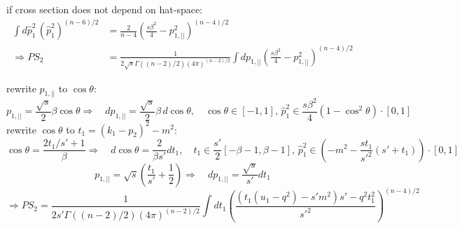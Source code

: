 if cross section does not depend on hat-space:
\begin{align}
\int\!\!d\hat p_1^2\,(\hat p_1^2)^{(n-6)/2} &= \frac 2 {n-4}\left(\frac{s \beta^2}{4}-p_{1,||}^2\right)^{(n-4)/2}\\
\Rightarrow PS_2 &= \frac 1 {2\sqrt s\Gamma((n-2)/2)(4\pi)^{(n-2)/2}}\int\!\!dp_{1,||}\left(\frac{s \beta^2}{4}-p_{1,||}^2\right)^{(n-4)/2}
\end{align}

rewrite $p_{1,||}$ to $\cos\theta$:
\begin{equation}
p_{1,||} = \frac{\sqrt s} 2 \beta\cos\theta \Rightarrow\quad dp_{1,||} = \frac{\sqrt s} 2 \beta\,d\!\cos\theta,\quad \cos\theta\in[-1,1],\, \hat p_1^2 \in \frac{s \beta^2}{4}\left(1-\cos^2\theta\right)\cdot[0,1]
\end{equation}
rewrite $\cos\theta$ to $t_1 = (k_1-p_2)^2-m^2$:
\begin{equation}
\cos\theta = \frac{2t_1/s'+1}{\beta} \Rightarrow\quad d\!\cos\theta = \frac 2 {\beta s'} dt_1,\quad t_1\in \frac {s'} 2[-\beta -1,\beta -1],\, \hat p_1^2 \in (-m^2-\frac{st_1}{s'^2}(s'+t_1))\cdot[0,1]
\end{equation}
\begin{equation}
p_{1,||} = \sqrt s\left(\frac{t_1}{s'}+\frac{1} 2\right) \Rightarrow\quad  dp_{1,||} = \frac{\sqrt s}{s'} dt_1
\end{equation}
\begin{equation}
\Rightarrow PS_2 = \frac 1 {2s'\Gamma((n-2)/2)(4\pi)^{(n-2)/2}}\int\!\!dt_1\left(\frac{(t_1(u_1-q^2)-s'm^2)s' - q^2t_1^2}{s'^2}\right)^{(n-4)/2}
\end{equation}
